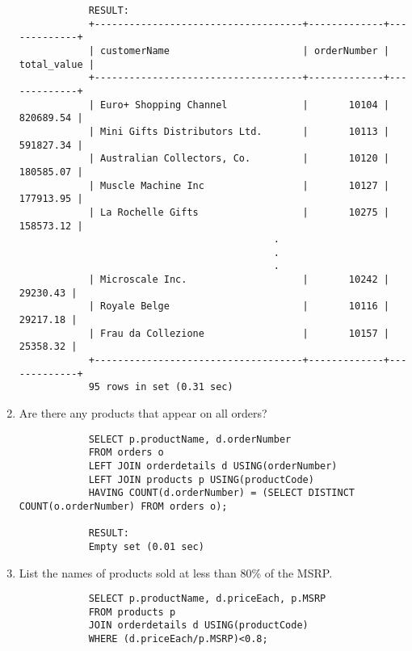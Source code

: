 \documentclass{article}
\begin{document}
\begin{enumerate}
\begin{verbatim}
			RESULT:
			+------------------------------------+-------------+-------------+
			| customerName                       | orderNumber | total_value |
			+------------------------------------+-------------+-------------+
			| Euro+ Shopping Channel             |       10104 |   820689.54 |
			| Mini Gifts Distributors Ltd.       |       10113 |   591827.34 |
			| Australian Collectors, Co.         |       10120 |   180585.07 |
			| Muscle Machine Inc                 |       10127 |   177913.95 |
			| La Rochelle Gifts                  |       10275 |   158573.12 |
			                                .
			                                .
			                                .
			| Microscale Inc.                    |       10242 |    29230.43 |
			| Royale Belge                       |       10116 |    29217.18 |
			| Frau da Collezione                 |       10157 |    25358.32 |
			+------------------------------------+-------------+-------------+
			95 rows in set (0.31 sec)
			\end{verbatim}
		\item Are there any products that appear on all orders?
			\begin{verbatim}
			SELECT p.productName, d.orderNumber
			FROM orders o
			LEFT JOIN orderdetails d USING(orderNumber)
			LEFT JOIN products p USING(productCode)
			HAVING COUNT(d.orderNumber) = (SELECT DISTINCT COUNT(o.orderNumber) FROM orders o);
			
			RESULT:
			Empty set (0.01 sec)
			\end{verbatim}
		\item List the names of products sold at less than 80\% of the MSRP.
			\begin{verbatim}
			SELECT p.productName, d.priceEach, p.MSRP
			FROM products p
			JOIN orderdetails d USING(productCode)
			WHERE (d.priceEach/p.MSRP)<0.8;
			

\end{verbatim}
\end{enumerate}
\end{document}
